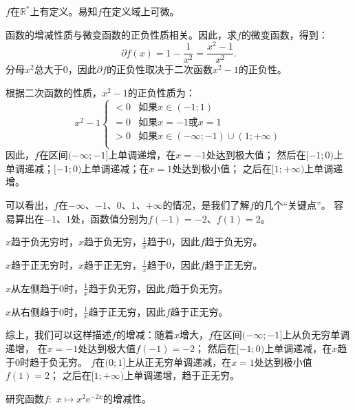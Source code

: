 \documentclass[12pt,UTF8]{ctexbook}
\begin{document}
\begin{so}
    $f$在$\mathbb{R}^*$上有定义。易知$f$在定义域上可微。

    函数的增减性质与微变函数的正负性质相关。因此，求$f$的微变函数，得到：
    $$ \partial f(x) = 1 - \frac{1}{x^2} = \frac{x^2 - 1}{x^2}.$$
    分母$ x^2 $总大于$0$，因此$ \partial f $的正负性取决于二次函数$x^2 - 1$的正负性。
    
    根据二次函数的性质，$x^2 - 1$的正负性质为：
    $$ x^2 - 1 \left\{
        \begin{array}{cl}
            < 0 & \mbox{如果}x \in (-1; 1) \\
            = 0 & \mbox{如果}x = -1 \mbox{或} x = 1 \\
            > 0 & \mbox{如果}x \in (-\infty; -1)\cup (1; +\infty)\\
        \end{array}\right.
    $$
    因此，$f$在区间$(-\infty; -1]$上单调递增，在$x = -1$处达到极大值；
    然后在$[-1; 0)$上单调递减；$[-1; 0)$上单调递减；在$x = 1$处达到极小值；
    之后在$[1; +\infty)$上单调递增。

    可以看出，$f$在$-\infty$、$-1$、$0$、$1$、$+\infty$的情况，是我们了解$f$的几个“关键点”。
    容易算出在$-1$、$1$处，函数值分别为$f(-1) = -2$、$f(1) = 2$。
    
    $x$趋于负无穷时，$x$趋于负无穷，$\frac{1}{x}$趋于$0$，因此$f$趋于负无穷。

    $x$趋于正无穷时，$x$趋于正无穷，$\frac{1}{x}$趋于$0$，因此$f$趋于正无穷。

    $x$从左侧趋于$0$时，$\frac{1}{x}$趋于负无穷，因此$f$趋于负无穷。
    
    $x$从右侧趋于$0$时，$\frac{1}{x}$趋于正无穷，因此$f$趋于正无穷。

    综上，我们可以这样描述$f$的增减：随着$x$增大，$f$在区间$(-\infty; -1]$上从负无穷单调递增，
    在$x = -1$处达到极大值$f(-1) = -2$；
    然后在$[-1; 0)$上单调递减，在$x$趋于$0$时趋于负无穷。
    $f$在$(0; 1]$上从正无穷单调递减，在$x = 1$处达到极小值$f(1) = 2$；
    之后在$[1; +\infty)$上单调递增，趋于正无穷。
\end{so}

\begin{et}
    研究函数$f:\,\,x\mapsto x^2 \mathrm{e}^{-2x}$的增减性。
\end{et}
\end{document}
